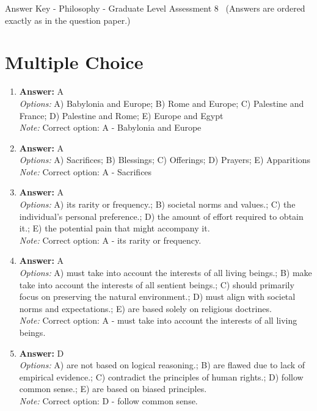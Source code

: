\documentclass[12pt]{article}
\begin{document}
\begin{center}
Answer Key - Philosophy - Graduate Level Assessment 8 \
\small (Answers are ordered exactly as in the question paper.)
\end{center}

\section*{Multiple Choice}
\begin{enumerate}[label=\arabic*.]
\item \textbf{Answer:} A
\\ \textit{Options:} A) Babylonia and Europe; B) Rome and Europe; C) Palestine and France; D) Palestine and Rome; E) Europe and Egypt
\\ \textit{Note:} Correct option: A - Babylonia and Europe
\item \textbf{Answer:} A
\\ \textit{Options:} A) Sacrifices; B) Blessings; C) Offerings; D) Prayers; E) Apparitions
\\ \textit{Note:} Correct option: A - Sacrifices
\item \textbf{Answer:} A
\\ \textit{Options:} A) its rarity or frequency.; B) societal norms and values.; C) the individual's personal preference.; D) the amount of effort required to obtain it.; E) the potential pain that might accompany it.
\\ \textit{Note:} Correct option: A - its rarity or frequency.
\item \textbf{Answer:} A
\\ \textit{Options:} A) must take into account the interests of all living beings.; B) make take into account the interests of all sentient beings.; C) should primarily focus on preserving the natural environment.; D) must align with societal norms and expectations.; E) are based solely on religious doctrines.
\\ \textit{Note:} Correct option: A - must take into account the interests of all living beings.
\item \textbf{Answer:} D
\\ \textit{Options:} A) are not based on logical reasoning.; B) are flawed due to lack of empirical evidence.; C) contradict the principles of human rights.; D) follow common sense.; E) are based on biased principles.
\\ \textit{Note:} Correct option: D - follow common sense.
\end{enumerate}
\end{document}
